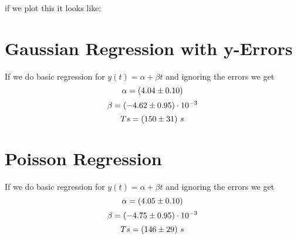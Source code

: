 \documentclass[11pt]{article}
\begin{document}
    if we plot this it looks like:
    
    

    \section{Gaussian Regression with y-Errors}
    If we do basic regression for $y(t) = \alpha + \beta t$ and ignoring the errors we get
    \begin{equation*}
        \alpha = (4.04 \pm 0.10)
    \end{equation*}
    \begin{equation*}
        \beta = (-4.62 \pm 0.95) \cdot 10^{-3}
    \end{equation*}
    \begin{equation*}
        Ts = (150 \pm 31)\ s
    \end{equation*}

    \section{Poisson Regression}
    If we do basic regression for $y(t) = \alpha + \beta t$ and ignoring the errors we get
    \begin{equation*}
        \alpha = (4.05 \pm 0.10)
    \end{equation*}
    \begin{equation*}
        \beta = (-4.75 \pm 0.95) \cdot 10^{-3}
    \end{equation*}
    \begin{equation*}
        Ts = (146 \pm 29)\ s
    \end{equation*}
    
\end{document}
